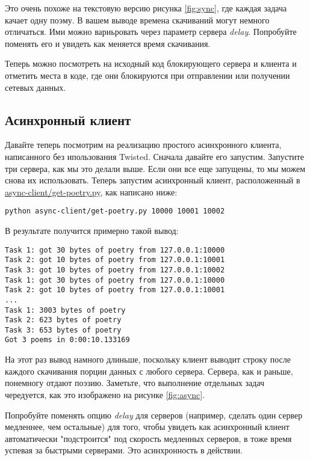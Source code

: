 Это очень похоже на текстовую версию рисунка \ref{fig:sync}, где 
каждая задача качает одну поэму. В вашем выводе времена скачиваний  
могут немного отличаться. Ими можно вариьровать через параметр сервера 
\textit{delay}. 
Попробуйте поменять его и увидеть как меняется время скачивания.


Теперь можно посмотреть на исходный код блокирующего сервера и 
клиента и отметить места в коде, где они блокируются при 
отправлении или получении сетевых данных.


\subsection{Асинхронный клиент}


    Давайте теперь посмотрим на реализацию простого 
асинхронного клиента, написанного без ипользования 
Twisted. Сначала давайте его запустим. Запустите три сервера, 
как мы это делали выше. 
Если они все еще запущены, то мы можем снова их 
использовать. Теперь запустим асинхронный клиент, 
расположенный в 
\href{http://github.com/jdavisp3/twisted-intro/blob/master/async-client/get-poetry.py}{async-client/get-poetry.py},  
как написано ниже:

\begin{verbatim}
python async-client/get-poetry.py 10000 10001 10002
\end{verbatim}


В результате получится примерно такой вывод:

\begin{verbatim}
Task 1: got 30 bytes of poetry from 127.0.0.1:10000
Task 2: got 10 bytes of poetry from 127.0.0.1:10001
Task 3: got 10 bytes of poetry from 127.0.0.1:10002
Task 1: got 30 bytes of poetry from 127.0.0.1:10000
Task 2: got 10 bytes of poetry from 127.0.0.1:10001
...
Task 1: 3003 bytes of poetry
Task 2: 623 bytes of poetry
Task 3: 653 bytes of poetry
Got 3 poems in 0:00:10.133169
\end{verbatim}

На этот раз вывод намного длиньше, поскольку клиент выводит 
строку после каждого скачивания порции данных с любого сервера. 
Сервера, как и раньше, понемногу отдают поэзию. 
Заметьте, что выполнение отдельных задач чередуется, как это изображено на 
рисунке \ref{fig:async}.


Попробуйте поменять опцию \textit{delay} 
для серверов (например, сделать 
один сервер медленнее, чем остальные) для того, чтобы увидеть 
как асинхронный клиент автоматически "подстроится" под скорость 
медленных серверов, в тоже время успевая за быстрыми серверами. 
Это асинхронность в действии. 


